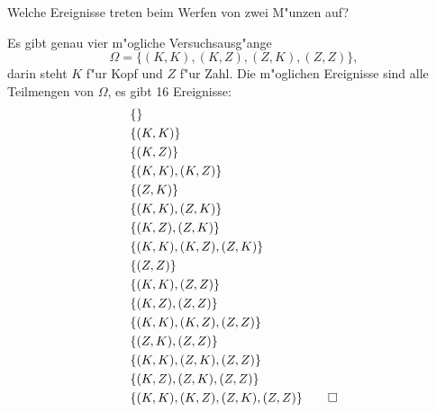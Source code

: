 Welche Ereignisse treten beim Werfen von zwei M"unzen auf?

\begin{loesung}
Es gibt genau vier m"ogliche Versuchsausg"ange
\[
\Omega=\{
(K,K),
(K,Z),
(Z,K),
(Z,Z)\},
\]
darin steht  $K$ f"ur Kopf und $Z$ f"ur Zahl.
Die m"oglichen Ereignisse sind alle Teilmengen von $\Omega$, es
gibt 16 Ereignisse:
\begin{align*}
&\{                           \}\\
&\{(K,K)                      \}\\
&\{       (K,Z)               \}\\
&\{(K,K), (K,Z)               \}\\
&\{              (Z,K)        \}\\
&\{(K,K),        (Z,K)        \}\\
&\{       (K,Z), (Z,K)        \}\\
&\{(K,K), (K,Z), (Z,K)        \}\\
&\{                     (Z,Z) \}\\
&\{(K,K),               (Z,Z) \}\\
&\{       (K,Z),        (Z,Z) \}\\
&\{(K,K), (K,Z),        (Z,Z) \}\\
&\{              (Z,K), (Z,Z) \}\\
&\{(K,K),        (Z,K), (Z,Z) \}\\
&\{       (K,Z), (Z,K), (Z,Z) \}\\
&\{(K,K), (K,Z), (Z,K), (Z,Z) \}
\qedhere
\end{align*}
\end{loesung}

